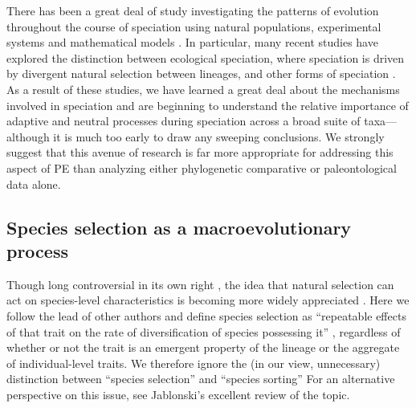 There has been a great deal of study investigating the patterns of evolution throughout the course of speciation using natural populations, experimental systems and mathematical models \citep[][and references within]{Schluter2000, CoyneOrr, Gavrilets2004, Rundle2005, Doebeli2011, Nosil2012}.  In particular, many recent studies have explored the distinction between ecological speciation, where speciation is driven by divergent natural selection between lineages, and other forms of speciation \citep[e.g., Bateson-Dobzhansky-Muller incompatibilities, speciation driven by sexual selection, etc.; reviewed in ][]{Nosil2012}. As a result of these studies, we have learned a great deal about the mechanisms involved in speciation and are beginning to understand the relative importance of adaptive and neutral processes during speciation across a broad suite of taxa---although it is much too early to draw any sweeping conclusions. We strongly suggest that this avenue of research is far more appropriate for addressing this aspect of PE than analyzing either phylogenetic comparative or paleontological data alone. 

\subsection{Species selection as a macroevolutionary process}

Though long controversial in its own right \citep{FitzJohnthesis}, the idea that natural selection can act on species-level characteristics is becoming more widely appreciated \citep{CoyneOrr, Jablonski2008, RaboskyMcCune2010, FitzJohnthesis}. Here we follow the lead of other authors \citep{Williams1992, CoyneOrr, RaboskyMcCune2010} and define species selection as  ``repeatable effects of that trait on the rate of diversification of species possessing it'' \citep[][p. 444]{CoyneOrr}, regardless of whether or not the trait is an emergent property of the lineage or the aggregate of individual-level traits. We therefore ignore the (in our view, unnecessary) distinction between ``species selection'' and ``species sorting'' \citep[\textit{sensu}][]{GouldVrba1986} For an alternative perspective on this issue, see Jablonski's excellent review \citeyearpar{Jablonski2008} of the topic.

